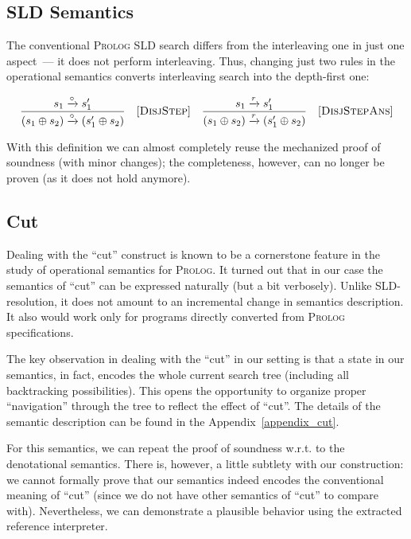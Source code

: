 \subsection{SLD Semantics}
\label{sld}

The conventional \textsc{Prolog} SLD search differs from the interleaving one in just one aspect~--- it does not perform interleaving.
Thus, changing just two rules in the operational semantics converts interleaving search into the depth-first one:

\[
  \begin{array}{crcr}
    \dfrac{s_1 \xrightarrow{\circ} s'_1}{(s_1 \oplus s_2) \xrightarrow{\circ} (s'_1 \oplus s_2)} &\mbox{[\textsc{DisjStep}]}&
    \dfrac{s_1 \xrightarrow{r} s'_1}{(s_1 \oplus s_2) \xrightarrow{r} (s'_1 \oplus s_2)} &\mbox{[\textsc{DisjStepAns}]}
  \end{array}
\]
\vskip3mm

With this definition we can almost completely reuse the mechanized proof of soundness (with minor changes); the completeness, however,
can no longer be proven (as it does not hold anymore).

\subsection{Cut}
\label{cut}

Dealing with the ``cut'' construct is known to be a cornerstone feature in the study of operational semantics for \textsc{Prolog}. It turned out that
in our case the semantics of ``cut'' can be expressed naturally (but a bit verbosely). Unlike SLD-resolution, it does not amount to an incremental
change in semantics description. It also would work only for programs directly converted from \textsc{Prolog} specifications.

The key observation in dealing with the ``cut'' in our setting is that a state in our semantics, in fact, encodes the whole current
search tree (including all backtracking possibilities). This opens the opportunity to organize proper ``navigation'' through the tree
to reflect the effect of ``cut''. The details of the semantic description can be found in the Appendix~\ref{appendix_cut}.

For this semantics, we can repeat the proof of soundness w.r.t. to the denotational semantics. There is, however, a little subtlety with our construction:
we cannot formally prove that our semantics indeed encodes the conventional meaning of ``cut'' (since we do not have other semantics of ``cut'' to compare with).
Nevertheless, we can demonstrate a plausible behavior using the extracted reference interpreter.

